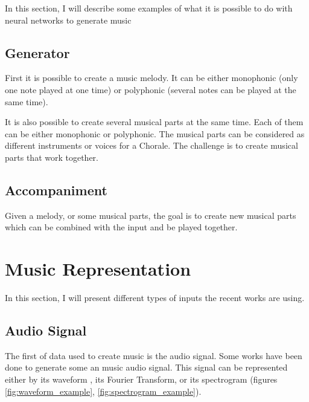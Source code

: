 \documentclass[12pt]{report}
\begin{document}
In this section, I will describe some examples of what it is possible to do with neural networks to generate music

\subsection{Generator}

First it is possible to create a music melody. It can be either monophonic (only one note played at one time) or polyphonic (several notes can be played at the same time).

It is also possible to create several musical parts at the same time. Each of them can be either monophonic or polyphonic.
The musical parts can be considered as different instruments or voices for a Chorale.
The challenge is to create musical parts that work together.

\subsection{Accompaniment}

Given a melody, or some musical parts, the goal is to create new musical parts which can be combined with the input and be played together.


\section{Music Representation}

In this section, I will present different types of inputs the recent works are using.

\subsection{Audio Signal} 

The first of data used to create music is the audio signal. Some works \cite{oord_wavenet:_2016} have been done to generate some an music audio signal.
This signal can be represented either by its waveform \cite{oord_wavenet:_2016}, its Fourier Transform, or its spectrogram (figures \ref{fig:waveform_example}, \ref{fig:spectrogram_example}).
\end{document}
